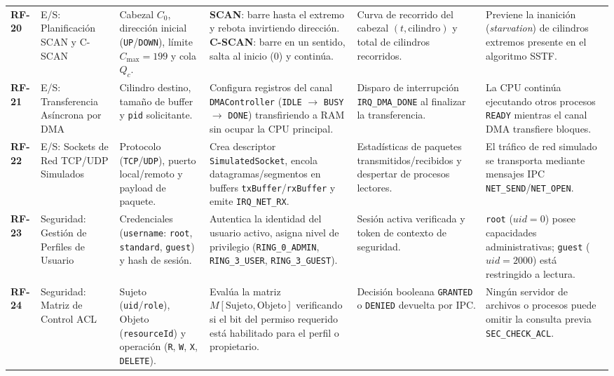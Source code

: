 \documentclass[10pt,twocolumn,letterpaper]{article}
\begin{document}
\begin{table}[!t]
\begin{tabularx}{\textwidth}{C{0.9cm} L{2.2cm} L{2.8cm} Y L{2.8cm} L{3.3cm}}
\textbf{RF-20} & E/S: Planificaci\'on SCAN y C-SCAN & Cabezal $C_0$, direcci\'on inicial (\texttt{UP}/\texttt{DOWN}), l\'imite $C_{\max}=199$ y cola $Q_c$. & \textbf{SCAN}: barre hasta el extremo y rebota invirtiendo direcci\'on. \textbf{C-SCAN}: barre en un sentido, salta al inicio ($0$) y contin\'ua. & Curva de recorrido del cabezal $(t, \text{cilindro})$ y total de cilindros recorridos. & Previene la inanici\'on (\textit{starvation}) de cilindros extremos presente en el algoritmo SSTF. \\
\textbf{RF-21} & E/S: Transferencia As\'incrona por DMA & Cilindro destino, tama\~no de buffer y \texttt{pid} solicitante. & Configura registros del canal \texttt{DMAController} (\texttt{IDLE} $\rightarrow$ \texttt{BUSY} $\rightarrow$ \texttt{DONE}) transfiriendo a RAM sin ocupar la CPU principal. & Disparo de interrupci\'on \texttt{IRQ\_DMA\_DONE} al finalizar la transferencia. & La CPU contin\'ua ejecutando otros procesos \texttt{READY} mientras el canal DMA transfiere bloques. \\
\textbf{RF-22} & E/S: Sockets de Red TCP/UDP Simulados & Protocolo (\texttt{TCP}/\texttt{UDP}), puerto local/remoto y payload de paquete. & Crea descriptor \texttt{SimulatedSocket}, encola datagramas/segmentos en buffers \texttt{txBuffer}/\texttt{rxBuffer} y emite \texttt{IRQ\_NET\_RX}. & Estad\'isticas de paquetes transmitidos/recibidos y despertar de procesos lectores. & El tr\'afico de red simulado se transporta mediante mensajes IPC \texttt{NET\_SEND}/\texttt{NET\_OPEN}. \\
\textbf{RF-23} & Seguridad: Gesti\'on de Perfiles de Usuario & Credenciales (\texttt{username}: \texttt{root}, \texttt{standard}, \texttt{guest}) y hash de sesi\'on. & Autentica la identidad del usuario activo, asigna nivel de privilegio (\texttt{RING\_0\_ADMIN}, \texttt{RING\_3\_USER}, \texttt{RING\_3\_GUEST}). & Sesi\'on activa verificada y token de contexto de seguridad. & \texttt{root} ($uid=0$) posee capacidades administrativas; \texttt{guest} ($uid=2000$) est\'a restringido a lectura. \\
\textbf{RF-24} & Seguridad: Matriz de Control ACL & Sujeto (\texttt{uid}/\texttt{role}), Objeto (\texttt{resourceId}) y operaci\'on (\texttt{R}, \texttt{W}, \texttt{X}, \texttt{DELETE}). & Eval\'ua la matriz $M[\text{Sujeto}, \text{Objeto}]$ verificando si el bit del permiso requerido est\'a habilitado para el perfil o propietario. & Decisi\'on booleana \texttt{GRANTED} o \texttt{DENIED} devuelta por IPC. & Ning\'un servidor de archivos o procesos puede omitir la consulta previa \texttt{SEC\_CHECK\_ACL}. \\

\end{tabularx}
\end{table}
\end{document}
